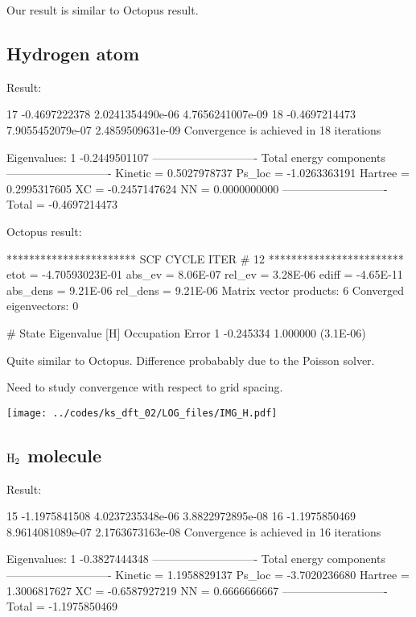 Our result is similar to Octopus result.


\subsection{Hydrogen atom}

Result:
\begin{textcode}
  17      -0.4697222378   2.0241354490e-06   4.7656241007e-09
  18      -0.4697214473   7.9055452079e-07   2.4859509631e-09
Convergence is achieved in 18 iterations

Eigenvalues:
 1      -0.2449501107
----------------------------
Total energy components
----------------------------
Kinetic =       0.5027978737
Ps_loc  =      -1.0263363191
Hartree =       0.2995317605
XC      =      -0.2457147624
NN      =       0.0000000000
----------------------------
Total   =      -0.4697214473
\end{textcode}

Octopus result:
\begin{fullwidth}
\begin{textcode}
*********************** SCF CYCLE ITER #   12 ************************
 etot  = -4.70593023E-01 abs_ev   =  8.06E-07 rel_ev   =  3.28E-06
 ediff =       -4.65E-11 abs_dens =  9.21E-06 rel_dens =  9.21E-06
Matrix vector products:      6
Converged eigenvectors:      0
 
 #  State  Eigenvalue [H]  Occupation    Error
       1       -0.245334    1.000000   (3.1E-06)
\end{textcode}
\end{fullwidth}

Quite similar to Octopus.
Difference probabably due to the Poisson solver.

Need to study convergence with respect to grid spacing.

{\centering
\texttt{[image: ../codes/ks\_dft\_02/LOG\_files/IMG\_H.pdf]}
}

\subsection{$\ce{H2}$ molecule}

Result:
\begin{textcode}
  15      -1.1975841508   4.0237235348e-06   3.8822972895e-08
  16      -1.1975850469   8.9614081089e-07   2.1763673163e-08
Convergence is achieved in 16 iterations

Eigenvalues:
 1      -0.3827444348
----------------------------
Total energy components
----------------------------
Kinetic =       1.1958829137
Ps_loc  =      -3.7020236680
Hartree =       1.3006817627
XC      =      -0.6587927219
NN      =       0.6666666667
----------------------------
Total   =      -1.1975850469
\end{textcode}

